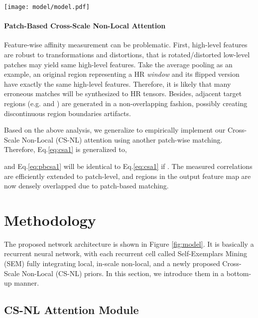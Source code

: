 \documentclass[10pt,twocolumn,letterpaper]{article}
\begin{document}
\begin{figure*}
   \centering
		\texttt{[image: model/model.pdf]}
\caption{The recurrent architecture with the proposed Self-Exemplars Mining (SEM) cell. Inside SEM, it fuses features learned from a proposed Cross-Scale Non-Local (CS-NL) attention, with others from the In-Scale Non-Local (IS-NL) and the local paths.} 
    \label{fig:model}
\end{figure*}


\paragraph{Patch-Based Cross-Scale Non-Local Attention}
Feature-wise affinity measurement can be problematic. First, high-level features are robust to transformations and distortions, that is rotated/distorted low-level patches may yield same high-level features. Take the average pooling as an example, an original region representing a HR \textit{window} and its flipped version have exactly the same high-level features. Therefore, it is likely that many erroneous matches will be synthesized to HR tensors. Besides, adjacent target regions (e.g.  and ) are generated in a non-overlapping fashion, possibly creating discontinuous region boundaries artifacts.   



Based on the above analysis, we generalize to empirically implement our Cross-Scale Non-Local (CS-NL) attention using another patch-wise matching. Therefore, Eq.\ref{eq:csa1} is generalized to,

and Eq.\ref{eq:pbcsa1} will be identical to Eq.\ref{eq:csa1} if . The measured correlations are efficiently extended to patch-level, and regions in the output feature map  are now densely overlapped due to patch-based matching. 


 \section{Methodology}

The proposed network architecture is shown in Figure \ref{fig:model}. It is basically a recurrent neural network, with each recurrent cell called Self-Exemplars Mining (SEM) fully integrating local, in-scale non-local, and a newly proposed Cross-Scale Non-Local (CS-NL) priors. In this section, we introduce them in a bottom-up manner.

\subsection{CS-NL Attention Module}
\end{document}
